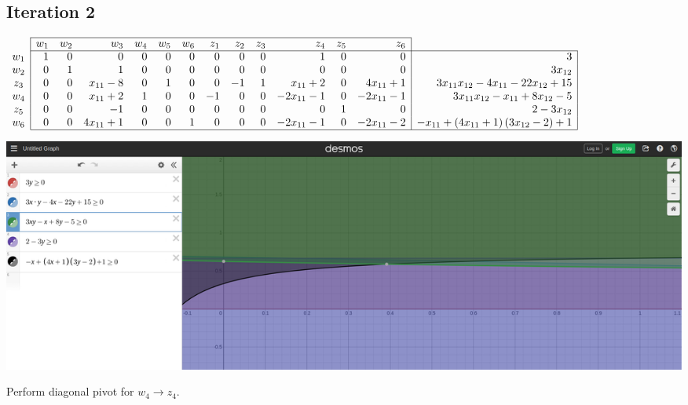 \documentclass[12pt]{article}
\begin{document}
\subsection*{Iteration 2}
{\footnotesize
$\begin{array}{c|rrrrrrrrrrrr|r|}
\cline{2-13}
& w_1 & w_2 & w_3 & w_4 & w_5 & w_6 & z_1 & z_2 & z_3 & z_4 & z_5 & z_6 \\
\cline{2-14}
w_1 & 1 & 0 & 0 & 0 & 0 & 0 & 0 & 0 & 0 & 1 & 0 & 0 & 3 \\
w_2 & 0 & 1 & 1 & 0 & 0 & 0 & 0 & 0 & 0 & 0 & 0 & 0 & 3 x_{12} \\
z_3 & 0 & 0 & x_{11} - 8 & 0 & 1 & 0 & 0 & -1 & 1 & x_{11} + 2 & 0 & 4 x_{11} + 1 & 3 x_{11} x_{12} - 4 x_{11} - 22 x_{12} + 15 \\
w_4 & 0 & 0 & x_{11} + 2 & 1 & 0 & 0 & -1 & 0 & 0 & - 2 x_{11} - 1 & 0 & - 2 x_{11} - 1 & 3 x_{11} x_{12} - x_{11} + 8 x_{12} - 5 \\
z_5 & 0 & 0 & -1 & 0 & 0 & 0 & 0 & 0 & 0 & 0 & 1 & 0 & 2 - 3 x_{12} \\
w_6 & 0 & 0 & 4 x_{11} + 1 & 0 & 0 & 1 & 0 & 0 & 0 & - 2 x_{11} - 1 & 0 & - 2 x_{11} - 2 & - x_{11} + \left(4 x_{11} + 1\right) \left(3 x_{12} - 2\right) + 1 \\
\cline{2-14}
\end{array}$
}

\begin{center}
\includegraphics[scale=.3]{Phase1_iteration2_visual}
\end{center}

Perform diagonal pivot for $w_4 \rightarrow z_4$.
\end{document}
